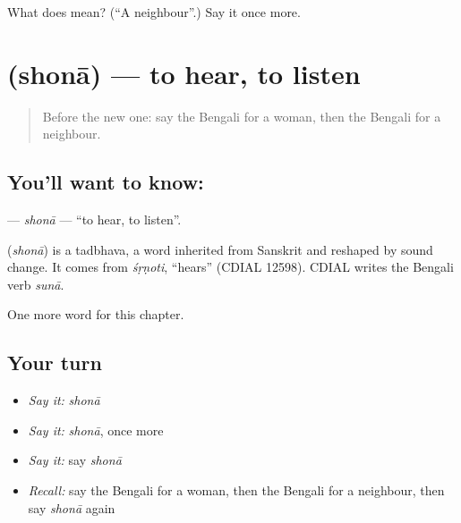 \begin{tcolorbox}[breakable,colback=teal!4,colframe=teal!35!black,title={Before you move on}]
What does  mean? (\textquotedblleft{}A neighbour\textquotedblright{}.) Say it once more.
\end{tcolorbox}
\section[\texorpdfstring{\bn{শোনা} (shonā)}{শোনা (shonā)}]{ (shonā) — to hear, to listen}

\label{lesson:BN-C48-shona}



\begin{quote}
Before the new one: say the Bengali for a woman, then the Bengali for a neighbour.
\end{quote}

\subsection*{You'll want to know: }
\textbf{} — \emph{shonā} — \textquotedblleft{}to hear, to listen\textquotedblright{}.

\begin{cousinweb}
\textbf{} (\emph{shonā}) is a tadbhava, a word inherited from Sanskrit and reshaped by sound change. It comes from \emph{śṛṇoti}, \textquotedblleft{}hears\textquotedblright{} (CDIAL 12598). CDIAL writes the Bengali verb \emph{sunā}.
\end{cousinweb}

\begin{grammarlens}[title={What you've built}]
One more word for this chapter.
\end{grammarlens}

\subsection*{Your turn}
\begin{itemize}
\raggedright
  \item \emph{Say it:} \emph{shonā}
  \item \emph{Say it:} \emph{shonā}, once more
  \item \emph{Say it:} say \emph{shonā}
  \item \emph{Recall:} say the Bengali for a woman, then the Bengali for a neighbour, then say \emph{shonā} again
\end{itemize}


